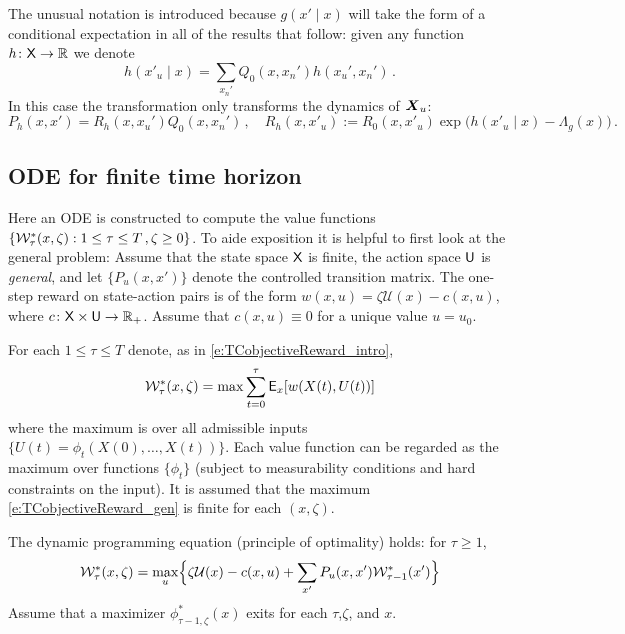 \documentclass[final,12pt]{colt2018} %
\def\util{{\mathcal{U}}}
\def\reward{w}
\def\EFn#1{\Lambda_{#1}}
\def\U{{\sf U}}
\def\state{{\sf X}}
\newcommand{\field}[1]{\mathbb{#1}}
\def\Re{\field{R}}
\def\bfmath#1{{\mathchoice{\mbox{\boldmath$#1$}}%
{\mbox{\boldmath$#1$}}%
{\mbox{\boldmath$\scriptstyle#1$}}%
{\mbox{\boldmath$\scriptscriptstyle#1$}}}}
\def\bfmX{\bfmath{X}}
\def\clW{{\cal W}}
\def\eqdef{\mathbin{:=}}
\def\Expect{{\sf E}}
\def\Re{\field{R}}
\begin{document}
The unusual notation is introduced because  $ g( x' \mid x )  $ will take the form of a conditional expectation in all of the results that follow:  given any function $h\colon\state\to \Re$ we denote
\begin{equation}
h(x'_u\mid  x)  =  \sum_{x_n'} Q_0(x,x_n') h(x_u',x_n') \, .
\label{e:hmid}
\end{equation}
In this case the transformation only transforms the dynamics of $\bfmX_u$:
\[
P_h(x,x')  = R_h(x,x_u') Q_0(x,x_n') \,,\quad
R_h(x,x'_u) \eqdef R_0(x,x'_u)\exp\bigl( h( x'_u \mid x )  -  \EFn{g}(x)    \bigr)\, .
\]





  
\subsection{ODE for finite time horizon}
\label{s:ODETC}

Here an ODE is constructed to compute the   value functions $\{\clW^*_\tau (x,\zeta)  : 1\le \tau \le T\,, \zeta\ge 0\}$.    To aide exposition it is helpful to first look at the general problem:   Assume that the state space $\state$ is finite, the action space $\U$ is \textit{general},  and let $\{P_u(x,x')\}$ denote the controlled transition matrix.   The  one-step reward on state-action pairs is of the form $\reward(x,u) = \zeta\util(x) - c(x,u)$,  where $c\colon\state\times\U\to\Re_+$.   Assume that  $c(x,u)\equiv 0$  for a unique value $u=u_0$.







For each $1\le \tau \le T$ denote, as in \eqref{e:TCobjectiveReward_intro},
\begin{equation}
\clW^*_\tau(x,\zeta) = \max \sum_{t=0}^\tau  \Expect_x[ w(X(t), U(t)) ]     
\label{e:TCobjectiveReward_gen}
\end{equation}  
where the maximum is over all admissible  %
inputs $\{U(t)=\phi_t(X(0),\dots,X(t))\}$.
Each value function can be regarded as the maximum over functions   $\{\phi_t\}$  (subject to measurability conditions and %
hard constraints on the input).  It is assumed that the maximum \eqref{e:TCobjectiveReward_gen} is finite for each $(x ,\zeta)$. 
 
The dynamic programming equation (principle of optimality) holds:  for $\tau\ge 1$,
\begin{equation}
\clW^*_\tau(x,\zeta) = \max_u \Bigl\{  \zeta\util(x)  -  c(x,u)     + \sum_{x'} P_u(x,x') \clW^*_{\tau-1} (x')  \Bigr\}
\label{e:TCobjectiveReward_gen_PoO}
\end{equation}  
Assume that a maximizer  $\phi^*_{\tau-1,\zeta}(x)$ exits for each $\tau$,$\zeta$, and $x$.
\end{document}
